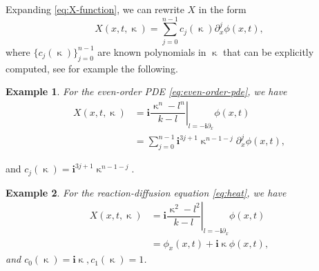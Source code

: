 \documentclass[journal,twoside,web]{ieeecolor}
\newtheorem{example}{Example}
\newcommand{\state}{\phi}
\newcommand{\im}{\mathbf{i}}
\newcommand{\kcomplex}{\upkappa}
\begin{document}
Expanding \eqref{eq:X-function}, we can rewrite $X$ in the form
\begin{equation}\label{eq:X-function-expansion}
	X(x,t,\kcomplex) = \sum_{j=0}^{n-1}c_j(\kcomplex)\partial_x^j \state(x,t),
\end{equation}
where $\{c_j(\kcomplex)\}_{j=0}^{n-1}$ are known polynomials in $\kcomplex$ that can be explicitly computed, see for example the following.
\begin{example}\label{example:X-function-even-order}
	For the even-order PDE \eqref{eq:even-order-pde}, we have
	\begin{align*}
		X(x,t,\kcomplex) &=\im\left.\dfrac{\kcomplex^n-l^n}{k-l}\right|_{l=-\im\partial_x}  \state(x,t)\\&=\sum_{j=0}^{n-1}\im^{3j+1} \kcomplex^{n-1-j}\partial_x^j \state(x,t),
	\end{align*}
\end{example}
and $c_j(\kcomplex) = \im^{3j+1} \kcomplex^{n-1-j}$.
\begin{example}
\label{example-X-function}	
	For the reaction-diffusion equation \eqref{eq:heat}, we have
	\begin{align*}
		X(x,t,\kcomplex) &=\im\left.\dfrac{\kcomplex^2-l^2}{k-l}\right|_{l=-\im\partial_x}  \state(x,t)\\&=\state_x(x,t) + \im \kcomplex\state(x,t),
	\end{align*}
and $c_0(\kcomplex) = \im \kcomplex, c_1(\kcomplex) = 1$.
\end{example}
\end{document}
